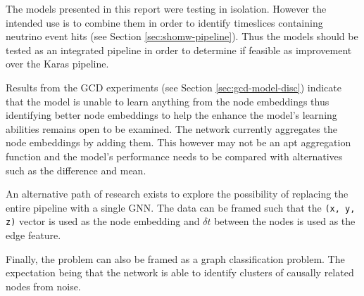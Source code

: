 The models presented in this report were testing in isolation. However
the intended use is to combine them in order to identify timeslices
containing neutrino event hits (see Section \ref{sec:shomw-pipeline}).
Thus the models should be tested as an integrated pipeline in order to
determine if feasible as improvement over the Karas pipeline.

Results from the GCD experiments (see Section
\ref{sec:gcd-model-disc}) indicate that the model is unable to learn
anything from the node embeddings thus identifying better node
embeddings to help the enhance the model's learning abilities remains
open to be examined. The network currently aggregates the node
embeddings by adding them. This however may not be an apt aggregation
function and the model's performance needs to be compared with
alternatives such as the difference and mean.

An alternative path of research exists to explore the possibility of
replacing the entire pipeline with a single GNN. The data can be
framed such that the \texttt{(x, y, z)} vector is used as the node
embedding and \texttt{$\delta t$} between the nodes is used as the
edge feature.

Finally, the problem can also
be framed as a graph classification problem. The expectation being
that the network is able to identify clusters of causally related
nodes from noise.
